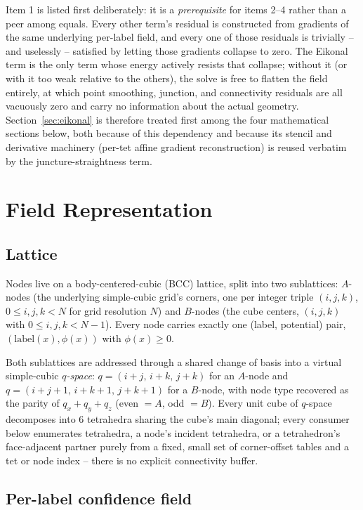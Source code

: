 \documentclass[11pt]{article}
\begin{document}
Item 1 is listed first deliberately: it is a \emph{prerequisite} for items
2--4 rather than a peer among equals. Every other term's residual is
constructed from gradients of the same underlying per-label field, and
every one of those residuals is trivially -- and uselessly -- satisfied by
letting those gradients collapse to zero. The Eikonal term is the only term
whose energy actively resists that collapse; without it (or with it too
weak relative to the others), the solve is free to flatten the field
entirely, at which point smoothing, junction, and connectivity residuals
are all vacuously zero and carry no information about the actual geometry.
Section~\ref{sec:eikonal} is therefore treated first among the four
mathematical sections below, both because of this dependency and because
its stencil and derivative machinery (per-tet affine gradient
reconstruction) is reused verbatim by the juncture-straightness term.

\section{Field Representation}

\subsection{Lattice}

Nodes live on a body-centered-cubic (BCC) lattice, split into two
sublattices: $A$-nodes (the underlying simple-cubic grid's corners, one per
integer triple $(i,j,k)$, $0 \le i,j,k < N$ for grid resolution $N$) and
$B$-nodes (the cube centers, $(i,j,k)$ with $0 \le i,j,k < N-1$). Every node
carries exactly one (label, potential) pair, $(\text{label}(x), \phi(x))$
with $\phi(x) \ge 0$.

Both sublattices are addressed through a shared change of basis into a
virtual simple-cubic \emph{$q$-space}: $q = (i+j,\,i+k,\,j+k)$ for an
$A$-node and $q=(i+j+1,\,i+k+1,\,j+k+1)$ for a $B$-node, with node type
recovered as the parity of $q_x+q_y+q_z$ (even $=A$, odd $=B$). Every unit
cube of $q$-space decomposes into $6$ tetrahedra sharing the cube's main
diagonal; every consumer below enumerates tetrahedra, a node's incident
tetrahedra, or a tetrahedron's face-adjacent partner purely from a fixed,
small set of corner-offset tables and a tet or node index -- there is no
explicit connectivity buffer.

\subsection{Per-label confidence field}
\end{document}
